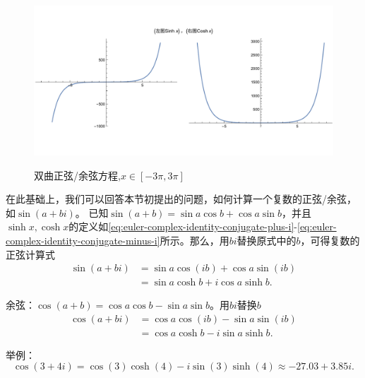 \begin{subappendices}
\begin{figure}[htbp]
  \caption{双曲正弦/余弦方程,$x \in \left[ -3 \pi, 3 \pi\right]$}
  \centering
  \includegraphics[width=12cm]{./Figures/20180401-sinh-cosh-x}
  \label{fig:sinh-cosh-function}
%
\end{figure}

在此基础上，我们可以回答本节初提出的问题，如何计算一个复数的正弦/余弦，如$\sin \left( a + bi \right)$。
已知$\sin(a+b) = \sin a \cos b + \cos a \sin b$，并且$\sinh x, \cosh x$的定义如\eqref{eq:euler-complex-identity-conjugate-plus-i}-\eqref{eq:euler-complex-identity-conjugate-minus-i}所示。那么，用$bi$替换原式中的$b$，可得复数的正弦计算式
\begin{equation}
  \label{eq:complex-sin-abi}
\begin{split}
  \sin \left( a + b i \right) & = \sin a \cos \left( i b \right) + \cos a  \sin \left( i b \right) \\
  & = \sin a \cosh b + i \cos a \sinh b.
\end{split}
\end{equation}

余弦：$\cos \left( a + b \right) = \cos a \cos b - \sin a \sin b$。用$bi$替换$b$
\begin{equation}
  \label{eq:complex-cos-abi}
\begin{split}
  \cos \left( a + bi \right) & = \cos a \cos \left( ib\right) - \sin a \sin \left( i b \right) \\
  & = \cos a \cosh b - i \sin a \sinh b.
\end{split}
\end{equation}

举例：
\begin{equation*}
  \cos \left( 3 + 4 i \right)
  = \cos (3) \cosh (4) - i \sin (3) \sinh (4)
  \approx -27.03 + 3.85 i.
\end{equation*}


\end{subappendices}
